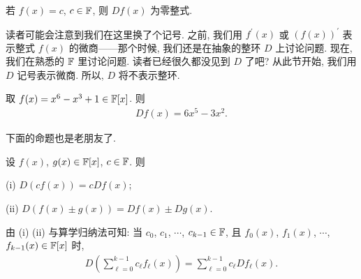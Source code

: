 \begin{remark}
    若 $f(x) = c$, $c \in \mathbb{F}$, 则 $Df(x)$ 为零整式.
\end{remark}

\begin{remark}
    读者可能会注意到我们在这里换了个记号. 之前, 我们用 $f^{\prime} (x)$ 或 $(f(x))^{\prime}$ 表示整式 $f(x)$ 的微商——那个时候, 我们还是在抽象的整环 $D$ 上讨论问题. 现在, 我们在熟悉的 $\mathbb{F}$ 里讨论问题. 读者已经很久都没见到 $D$ 了吧? 从此节开始, 我们用 $D$ 记号表示微商. 所以, $D$ 将不表示整环.
\end{remark}

\begin{example}
    取 $f(x) = x^6 - x^3 + 1 \in \mathbb{F}[x]$. 则
    \begin{align*}
        Df(x) = 6x^5 - 3x^2.
    \end{align*}
\end{example}

下面的命题也是老朋友了.

\begin{proposition}
    设 $f(x)$, $g(x) \in \mathbb{F}[x]$, $c \in \mathbb{F}$. 则

    (i) $D(cf(x)) = c Df(x)$;

    (ii) $D(f(x) \pm g(x)) = Df(x) \pm Dg(x)$.

    由 (i) (ii) 与算学归纳法可知: 当 $c_0$, $c_1$, $\cdots$, $c_{k-1} \in \mathbb{F}$, 且 $f_0 (x)$, $f_1 (x)$, $\cdots$, $f_{k-1} (x) \in \mathbb{F}[x]$ 时,
    \begin{align*}
        D \left( \sum_{\ell = 0}^{k-1} c_\ell f_\ell (x) \right) = \sum_{\ell = 0}^{k-1} c_\ell Df_\ell (x).
    \end{align*}
\end{proposition}

